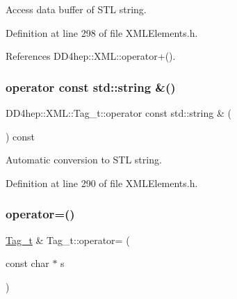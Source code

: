 Access data buffer of S\+TL string. 



Definition at line 298 of file X\+M\+L\+Elements.\+h.



References D\+D4hep\+::\+X\+M\+L\+::operator+().

\hypertarget{class_d_d4hep_1_1_x_m_l_1_1_tag__t_aac5fcbab32da998df43084e6de3666c5}{}\label{class_d_d4hep_1_1_x_m_l_1_1_tag__t_aac5fcbab32da998df43084e6de3666c5} 
\subsubsection{\texorpdfstring{operator const std\+::string \&()}{operator const std::string \&()}}
{\footnotesize\ttfamily D\+D4hep\+::\+X\+M\+L\+::\+Tag\+\_\+t\+::operator const std\+::string \& (\begin{DoxyParamCaption}{ }\end{DoxyParamCaption}) const\hspace{0.3cm}{\ttfamily [inline]}}



Automatic conversion to S\+TL string. 



Definition at line 290 of file X\+M\+L\+Elements.\+h.

\hypertarget{class_d_d4hep_1_1_x_m_l_1_1_tag__t_a170961001c2a13473b9258cd92a27faf}{}\label{class_d_d4hep_1_1_x_m_l_1_1_tag__t_a170961001c2a13473b9258cd92a27faf} 
\subsubsection{\texorpdfstring{operator=()}{operator=()}\hspace{0.1cm}{\footnotesize\ttfamily [1/4]}}
{\footnotesize\ttfamily \hyperlink{class_d_d4hep_1_1_x_m_l_1_1_tag__t}{Tag\+\_\+t} \& Tag\+\_\+t\+::operator= (\begin{DoxyParamCaption}\item[{const char $\ast$}]{s }\end{DoxyParamCaption})}



